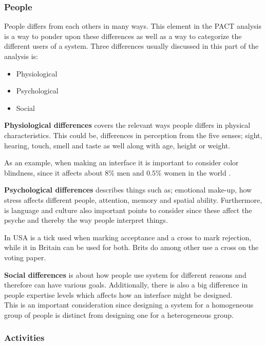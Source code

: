 \subsubsection*{People}
People differs from each others in many ways.
This element in the PACT analysis is a way to ponder upon these differences as well as a way to categorize the different users of a system. 
Three differences usually discussed in this part of the analysis is:
\begin{itemize}
	\item Physiological
	\item Psychological
	\item Social
\end{itemize}

\textbf{Physiological differences} covers the relevant ways people differs in physical characteristics.
This could be, differences in perception from the five senses; sight, hearing, touch, smell and taste as well along with age, height or weight.
\begin{example} 
As an example, when making an interface it is important to consider color blindness, since it affects about $8\%$ men and $0.5\%$ women in the world \cite{ColourBlind}.
\end{example}

\textbf{Psychological differences} describes things such as; emotional make-up, how stress affects different people, attention, memory and spatial ability.
Furthermore, is language and culture also important points to consider since these affect the psyche and thereby the way people interpret things.
\begin{example}
	In USA is a tick used when marking acceptance and a cross to mark rejection, while it in Britain can be used for both. Brits do among other use a cross on the voting paper.
\end{example}


\textbf{Social differences} is about how people use system for different reasons and therefore can have various goals. 
Additionally, there is also a big difference in people expertise levels which affects how an interface might be designed.
\\\indent
This is an important consideration since designing a system for a homogeneous group of people is  distinct from designing one for a heterogeneous group.

\subsubsection*{Activities}

